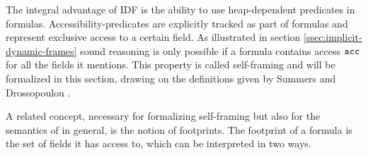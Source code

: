 The integral advantage of IDF is the ability to use heap-dependent predicates in formulas.
Accessibility-predicates are explicitly tracked as part of formulas and represent exclusive access to a certain field.
As illustrated in section \ref{ssec:implicit-dynamic-frames} sound reasoning is only possible if a formula contains access $\textup{\texttt{acc}}$ for all the fields it mentions.
This property is called self-framing and will be formalized in this section, drawing on the definitions given by Summers and Drossopoulou \cite{summers2013formal}.

A related concept, necessary for formalizing self-framing but also for the semantics of \svlidf in general, is the notion of footprints.
The footprint of a formula is the set of fields it has access to, which can be interpreted in two ways.
